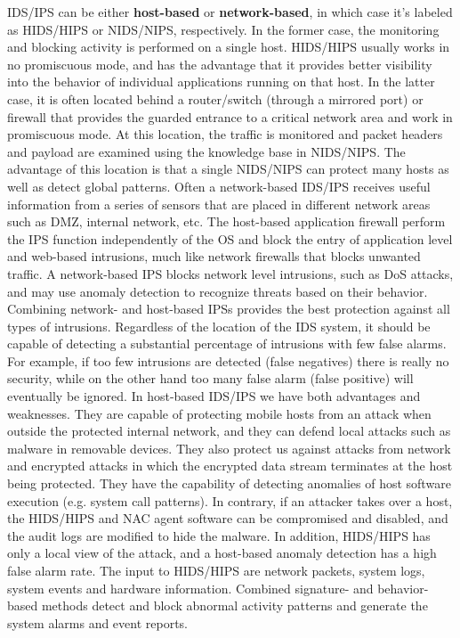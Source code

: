 \documentclass[11pt]{article}
\begin{document}
IDS/IPS can be either \textbf{host-based} or \textbf{network-based}, in which case it's labeled as HIDS/HIPS or NIDS/NIPS, respectively. In the former case, the monitoring and blocking activity is performed on a single host. HIDS/HIPS usually works in no promiscuous mode, and has the advantage that it provides better visibility into the behavior of individual applications running on that host. In the latter case, it is often located behind a router/switch (through a mirrored port) or firewall that provides the guarded entrance to a critical network area and work in promiscuous mode. At this location, the traffic is monitored and packet headers and payload are examined using the knowledge base in NIDS/NIPS. The advantage of this location is that a single NIDS/NIPS can protect many hosts as well as detect global patterns. Often a network-based IDS/IPS receives useful information from a series of sensors that are placed in different network areas such as DMZ, internal network, etc. The host-based application firewall perform the IPS function independently of the OS and block the entry of application level and web-based intrusions, much like network firewalls that blocks unwanted traffic. A network-based IPS blocks network level intrusions, such as DoS attacks, and may use anomaly detection to recognize threats based on their behavior. Combining network- and host-based IPSs provides the best protection against all types of intrusions. Regardless of the location of the IDS system, it should be capable of detecting a substantial percentage of intrusions with few false alarms. For example, if too few intrusions are detected (false negatives) there is really no security, while on the other hand too many false alarm (false positive) will eventually be ignored. 
In host-based IDS/IPS we have both advantages and weaknesses. They are capable of protecting mobile hosts from an attack when outside the protected internal network, and they can defend local attacks such as malware in removable devices. They also protect us against attacks from network and encrypted attacks in which the encrypted data stream terminates at the host being protected. They have the capability of detecting anomalies of host software execution (e.g. system call patterns). In contrary, if an attacker takes over a host, the HIDS/HIPS and NAC agent software can be compromised and disabled, and the audit logs are modified to hide the malware. In addition, HIDS/HIPS has only a local view of the attack, and a host-based anomaly detection has a high false alarm rate. The input to HIDS/HIPS are network packets, system logs, system events and hardware information. Combined signature- and behavior-based methods detect and block abnormal activity patterns and generate the system alarms and event reports.
\end{document}
